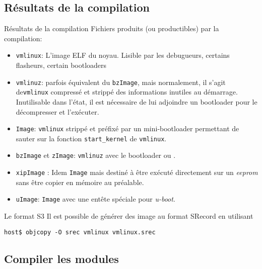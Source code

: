 \subsection{Résultats de la compilation}

\begin{frame}[fragile=singleslide]{Résultats de la compilation}
  Fichiers produits (ou productibles) par la compilation:
  \begin{itemize}
  \item  \verb+vmlinux+:  L'image  ELF  du  noyau.   Lisible  par  les
    debugueurs, certains flasheurs, certain bootloaders
  \item  \verb+vmlinuz+: parfois  équivalent  du \verb+bzImage+,  mais
    normalement, il  s'agit de\verb+vmlinux+ compressé  et strippé des
    informations inutiles  au démarrage. Inutilisable  dans l'état, il
    est nécessaire de lui adjoindre un bootloader pour le décompresser
    et l'exécuter.
  \item  \verb+Image+:  \verb+vmlinux+   strippé  et  préfixé  par  un
    mini-bootloader   permettant    de   sauter   sur    la   fonction
    \verb+start_kernel+ de \verb+vmlinux+.
  \item  \verb+bzImage+  et   \verb+zImage+:  \verb+vmlinuz+  avec  le
    bootloader  ou .
  \item  \verb+xipImage+  :  Idem  \verb+Image+ mais  destiné  à  être
    exécuté  directement  sur un  \emph{eeprom}  sans  être copier  en
    mémoire au préalable.
  \item  \verb+uImage+:  \verb+Image+ avec  une  entête spéciale  pour
    \emph{u-boot}.
  \end{itemize}
\end{frame}

\begin{frame}[fragile=singleslide]{Le format S3}
  Il est possible  de générer des image au  format SRecord en utilisant
  \begin{lstlisting}
host$ objcopy -O srec vmlinux vmlinux.srec
  \end{lstlisting}
\end{frame}

\subsection{Compiler les modules}

